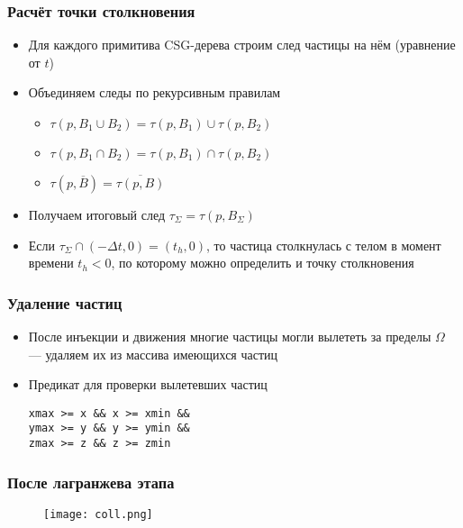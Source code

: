 \documentclass[onlymath]{beamer}
\begin{document}
\begin{frame}
  \frametitle{Расчёт точки столкновения}
  \begin{itemize}
  \item Для каждого примитива CSG-дерева строим след частицы на нём
    (уравнение от $t$)
  \item Объединяем следы по рекурсивным правилам
    \begin{itemize}
    \item $\tau(p, B_1 \cup B_2) = \tau(p, B_1) \cup \tau(p, B_2)$
    \item $\tau(p, B_1 \cap B_2) = \tau(p, B_1) \cap \tau(p, B_2)$
    \item $\tau(p, \overline{B}) = \overline{\tau(p, B)}$
    \end{itemize}
  \item Получаем итоговый след $\tau_\Sigma = \tau(p, B_\Sigma)$
  \item Если $\tau_\Sigma \cap (-\Delta t, 0) = (t_h, 0)$, то
    частица столкнулась с телом в момент времени $t_h < 0$, по
    которому можно определить и точку столкновения
  \end{itemize}
\end{frame}

\begin{frame}[fragile]
  \frametitle{Удаление частиц}
  \begin{itemize}
  \item После инъекции и движения многие частицы могли вылететь за
    пределы $\Omega$ — удаляем их из массива имеющихся частиц
  \item Предикат для проверки вылетевших частиц
\begin{lstlisting}
xmax >= x && x >= xmin &&
ymax >= y && y >= ymin &&
zmax >= z && z >= zmin
\end{lstlisting}
  \end{itemize}
\end{frame}

\begin{frame}
  \frametitle{После лагранжева этапа}
  \begin{figure}
    \centering
    \texttt{[image: coll.png]}
  \end{figure}  
\end{frame}
\end{document}
